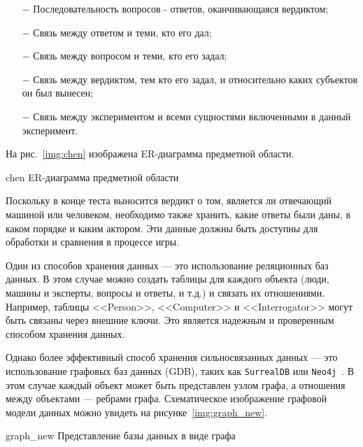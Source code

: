 \begin{enumerate}
    \begin{itemize}
      \item[$-$] Последовательность вопросов - ответов, оканчивающаяся вердиктом;
      \item[$-$] Связь между ответом и теми, кто его дал;
      \item[$-$] Связь между вопросом и теми, кто его задал;
      \item[$-$] Связь между вердиктом, тем кто его задал, и относительно каких субъектов он был вынесен;
      \item[$-$] Связь между экспериментом и всеми сущностями включенными в данный эксперимент.
    \end{itemize}
\end{enumerate}

На рис.~\ref{img:chen} изображена ER-диаграмма предметной области.

\img{200mm}
{chen}
{ER-диаграмма предметной области}

\clearpage

Поскольку в конце теста выносится вердикт о том, является ли отвечающий машиной или человеком, необходимо также хранить, какие ответы были даны, в каком порядке и каким актором. 
Эти данные должны быть доступны для обработки и сравнения в процессе игры.
 
Один из способов хранения данных --- это использование реляционных баз данных. В этом случае можно создать таблицы для каждого объекта (люди, машины и эксперты, вопросы и ответы, и т.д.) и связать их отношениями. 
Например, таблицы <<Person>>, <<Computer>> и <<Interrogator>> могут быть связаны через внешние ключи. 
Это является надежным и проверенным способом хранения данных.

Однако более эффективный способ хранения сильносвязанных данных --- это использование графовых баз данных (GDB), таких как \texttt{SurrealDB} или \texttt{Neo4j}~\cite{DBLP:journals/corr/LinMPS16}. 
В этом случае каждый объект может быть представлен узлом графа, а отношения между объектами --- ребрами графа. Схематическое изображение графовой модели данных можно увидеть на рисунке~\ref{img:graph_new}.

\img{100mm}
{graph_new}
{Представление базы данных в виде графа}

